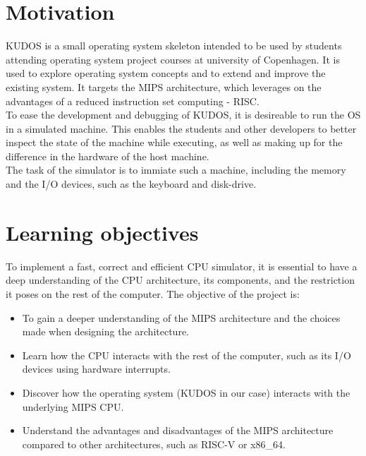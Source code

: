 \documentclass[11pt]{article}
\begin{document}
\section{Motivation}
KUDOS is a small operating system skeleton intended to be used by students
attending operating system project courses at university of Copenhagen.
It is used to explore operating system concepts and to extend and improve the
existing system.
It targets the MIPS architecture, which leverages on the advantages of a
reduced instruction set computing - RISC.\\
To ease the development and debugging of KUDOS, it is desireable to run the OS
in a simulated machine. This enables the students and other developers to
better inspect the state of the machine while executing, as well as making up
for the difference in the hardware of the host machine.\\
The task of the simulator is to immiate such a machine, including the memory
and the I/O devices, such as the keyboard and disk-drive.


\section{Learning objectives}
To implement a fast, correct and efficient CPU simulator, it is essential
to have a deep understanding of the CPU architecture, its components, and
the restriction it poses on the rest of the computer.
The objective of the project is:
\begin{itemize}
\item To gain a deeper understanding of the MIPS architecture and the choices
made when
designing the architecture.
\item Learn how the CPU interacts with the rest of the computer, such as
its I/O devices using hardware interrupts.
\item Discover how the operating system (KUDOS in our case) interacts with the
underlying MIPS CPU.
\item Understand the advantages and disadvantages of the MIPS architecture
compared to other architectures, such as RISC-V or x86\_64.
\end{itemize}
\end{document}

